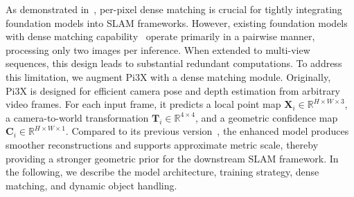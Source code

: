 
As demonstrated in~\cite{murai2024_mast3rslam, artdeco}, per-pixel dense matching is crucial for tightly integrating foundation models into SLAM frameworks. However, existing foundation models with dense matching capability~\cite{leroy2024grounding} operate primarily in a pairwise manner, processing only two images per inference. When extended to multi-view sequences, this design leads to substantial redundant computations. To address this limitation, we augment Pi3X with a dense matching module. Originally, Pi3X is designed for efficient camera pose and depth estimation from arbitrary video frames. For each input frame, it predicts a local point map $\mathbf{X}_i \in \mathbb{R}^{H \times W \times 3}$, a camera-to-world transformation $\mathbf{T}_i \in \mathbb{R}^{4 \times 4}$, and a geometric confidence map $\mathbf{C}_i \in \mathbb{R}^{H \times W \times 1}$. Compared to its previous version~\cite{wang2025pi}, the enhanced model produces smoother reconstructions and supports approximate metric scale, thereby providing a stronger geometric prior for the downstream SLAM framework. In the following, we describe the model architecture, training strategy, dense matching, and dynamic object handling.

